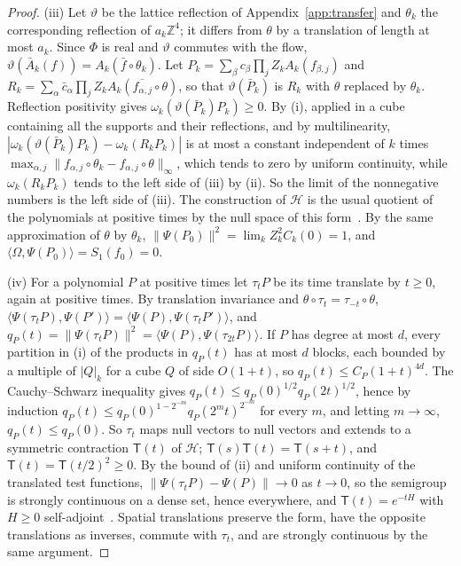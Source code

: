 \documentclass[11pt]{amsart}
\theoremstyle{definition}
\theoremstyle{remark}
\numberwithin{equation}{section}
\newcommand{\Z}{\mathbb{Z}}
\newcommand{\ip}[2]{\langle #1,#2\rangle}
\begin{document}
\begin{proof}
(iii) Let $\vartheta$ be the lattice reflection of
Appendix~\ref{app:transfer} and $\theta_k$ the corresponding reflection of
$a_k\Z^4$; it differs from $\theta$ by a translation of length at most $a_k$.
Since $\Phi$ is real and $\vartheta$ commutes with the flow,
$\vartheta(\bar A_k(f))=A_k(\bar f\circ\theta_k)$. Let
$P_k=\sum_\beta c_\beta\prod_jZ_kA_k(f_{\beta,j})$ and
$R_k=\sum_\alpha\bar c_\alpha\prod_jZ_kA_k(\overline{f_{\alpha,j}}\circ\theta)$,
so that $\vartheta(\bar P_k)$ is $R_k$ with $\theta$ replaced by $\theta_k$.
Reflection positivity gives $\omega_k(\vartheta(\bar P_k)P_k)\ge0$. By (i),
applied in a cube containing all the supports and their reflections, and by
multilinearity, $|\omega_k(\vartheta(\bar P_k)P_k)-\omega_k(R_kP_k)|$ is at
most a constant independent of $k$ times
$\max_{\alpha,j}\|f_{\alpha,j}\circ\theta_k-f_{\alpha,j}\circ\theta\|_\infty$,
which tends to zero by uniform continuity, while $\omega_k(R_kP_k)$ tends to
the left side of (iii) by (ii). So the limit of the nonnegative
numbers is the left side of (iii). The construction of $\mathcal H$ is the
usual quotient of the polynomials at positive times by the null space of this
form~\cite{OS73}. By the same approximation of $\theta$ by $\theta_k$,
$\|\Psi(P_0)\|^2=\lim_kZ_k^2C_k(0)=1$, and $\ip\Omega{\Psi(P_0)}=S_1(f_0)=0$.

(iv) For a polynomial $P$ at positive times let $\tau_tP$ be its time
translate by $t\ge0$, again at positive times. By translation invariance and
$\theta\circ\tau_t=\tau_{-t}\circ\theta$, $\ip{\Psi(\tau_tP)}{\Psi(P')}=
\ip{\Psi(P)}{\Psi(\tau_tP')}$, and $q_P(t)=\|\Psi(\tau_tP)\|^2=
\ip{\Psi(P)}{\Psi(\tau_{2t}P)}$. If $P$ has degree at most $d$, every
partition in (i) of the products in $q_P(t)$ has at most $d$ blocks, each
bounded by a multiple of $|Q|_k$ for a cube $Q$ of side $O(1+t)$, so
$q_P(t)\le C_P(1+t)^{4d}$. The Cauchy--Schwarz inequality gives
$q_P(t)\le q_P(0)^{1/2}q_P(2t)^{1/2}$, hence by induction
$q_P(t)\le q_P(0)^{1-2^{-m}}q_P(2^mt)^{2^{-m}}$ for every $m$, and letting
$m\to\infty$, $q_P(t)\le q_P(0)$. So $\tau_t$ maps null vectors to null
vectors and extends to a symmetric contraction $\mathsf T(t)$ of $\mathcal
H$; $\mathsf T(s)\mathsf T(t)=\mathsf T(s+t)$, and $\mathsf T(t)=\mathsf
T(t/2)^2\ge0$. By the bound of (ii) and uniform continuity of the translated
test functions, $\|\Psi(\tau_tP)-\Psi(P)\|\to0$ as $t\to0$, so the semigroup
is strongly continuous on a dense set, hence everywhere, and $\mathsf
T(t)=e^{-tH}$ with $H\ge0$ self-adjoint~\cite{OS73}. Spatial translations
preserve the form, have the opposite translations as inverses, commute with
$\tau_t$, and are strongly continuous by the same argument.


\end{proof}
\end{document}
